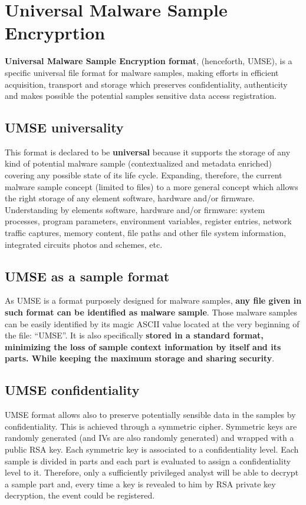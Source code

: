 \section{Universal Malware Sample Encryprtion}

\textbf{Universal Malware Sample Encryption format}, (henceforth, UMSE), is a
specific universal file format for malware samples, making efforts in
efficient acquisition, transport and storage which preserves confidentiality,
authenticity and makes possible the potential samples sensitive data access
registration.

\subsection{UMSE universality}

This format is declared to be \textbf{universal} because it supports the
storage of any kind of potential malware sample (contextualized and metadata
enriched) covering any possible state of its life cycle. Expanding, therefore,
the current malware sample concept\cite{ZeltserShareMalware} (limited to files) to a more general
concept which allows the right storage of any element software, hardware
and/or firmware.  Understanding by elements software, hardware and/or
firmware: system processes, program parameters, environment variables,
register entries, network traffic captures, memory content, file paths and
other file system information, integrated circuits photos and schemes, etc.

\subsection{UMSE as a sample format}

As UMSE is a format purposely designed for malware samples, \textbf{any file
  given in such format can be identified as malware sample}. Those malware
samples can be easily identified by its magic ASCII value located at the very
beginning of the file: “UMSE”. It is also specifically \textbf{stored in a
  standard format, minimizing the loss of sample context information by itself
  and its parts. While keeping the maximum storage and sharing security}.

\subsection{UMSE confidentiality}

UMSE format allows also to preserve potentially sensible data in the samples
by confidentiality. This is achieved through a symmetric cipher. Symmetric
keys are randomly generated (and IVs are also randomly generated) and wrapped
with a public RSA key.  Each symmetric key is associated to a confidentiality
level. Each sample is divided in parts and each part is evaluated to assign a
confidentiality level to it. Therefore, only a sufficiently privileged analyst
will be able to decrypt a sample part and, every time a key is revealed to him
by RSA private key decryption, the event could be registered.

